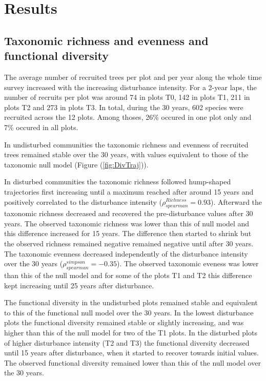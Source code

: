 \documentclass[fleqn,10pt]{ArtEcoFoG} %
\begin{document}
\section{Results}\label{results}

\subsection{Taxonomic richness and evenness and functional
diversity}\label{taxonomic-richness-and-evenness-and-functional-diversity}

The average number of recruited trees per plot and per year along the
whole time survey increased with the increasing disturbance intensity.
For a 2-year laps, the number of recruits per plot was around 74 in
plots T0, 142 in plots T1, 211 in plots T2 and 273 in plots T3. In
total, during the 30 years, 602 species were recruited across the 12
plots. Among thoses, 26\% occured in one plot only and 7\% occured in
all plots.

In undisturbed communities the taxonomic richness and evenness of
recruited trees remained stable over the 30 years, with values
equivalent to those of the taxonomic null model (Figure
(\ref{fig:DivTraj})).

In disturbed communities the taxonomic richness followed hump-shaped
trajectories first increasing until a maximum reached after around 15
years and positively correlated to the disturbance intensity
(\(\rho^{Richness}_{spearman}=0.93\)). Afterward the taxonomic richness
decreased and recovered the pre-disturbance values after 30 years. The
observed taxonomic richness was lower than this of null model and this
difference increased for 15 years. The difference then started to shrink
but the observed richness remained negative remained negative until
after 30 years. The taxonomic evenness decreased independently of the
disturbance intensity over the 30 years
(\(\rho^{simpson}_{spearman}=-0.35\)). The observed taxonomic eveness
was lower than this of the null model and for some of the plots T1 and
T2 this difference kept increasing until 25 years after disturbance.

The functional diversity in the undisturbed plots remained stable and
equivalent to this of the functional null model over the 30 years. In
the lowest disturbance plots the functional diversity remained stable or
slightly increasing, and was higher than this of the null model for two
of the T1 plots. In the disturbed plots of higher disturbance intensity
(T2 and T3) the functional diversity decreased until 15 years after
disturbance, when it started to recover towards initial values. The
observed functional diversity remained lower than this of the null model
over the 30 years.
\end{document}
